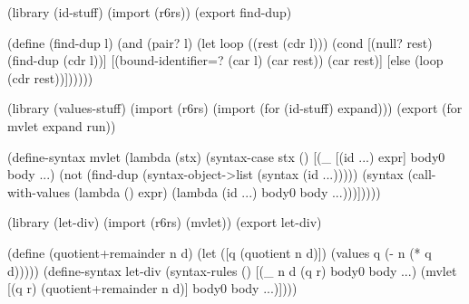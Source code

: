 \begin{schemenoindent}
(library (id-stuff)
  (import (r6rs))
  (export find-dup)

  (define (find-dup l)
    (and (pair? l)
         (let loop ((rest (cdr l)))
           (cond
            [(null? rest) (find-dup (cdr l))]
            [(bound-identifier=? (car l) (car rest)) 
                                 (car rest)]
            [else (loop (cdr rest))])))))

(library (values-stuff)
  (import (r6rs) (import (for (id-stuff) expand)))
  (export (for mvlet expand run))

  (define-syntax mvlet
    (lambda (stx)
      (syntax-case stx ()
        [(\_ [(id ...) expr] body0 body ...)
         (not (find-dup
                (syntax-object->list
                  (syntax (id ...)))))
         (syntax
           (call-with-values
               (lambda () expr) 
             (lambda (id ...) body0 body ...)))]))))

(library (let-div)
  (import (r6rs) (mvlet))
  (export let-div)

  (define (quotient+remainder n d)
    (let ([q (quotient n d)])
      (values q (- n (* q d)))))
  (define-syntax let-div
    (syntax-rules ()
     [(\_ n d (q r) body0 body ...)
      (mvlet [(q r) (quotient+remainder n d)]
        body0 body ...)])))%
\end{schemenoindent}


